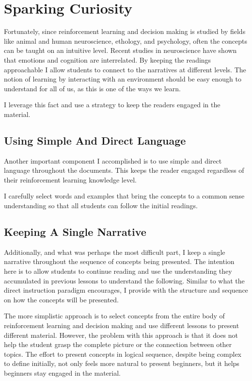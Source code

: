 \documentclass[11pt]{article} %
\begin{document}
\section{Sparking Curiosity}

Fortunately, since reinforcement learning and decision making is studied
by fields like animal and human neuroscience, ethology, and psychology\cite{suttons98},
often the concepts can be taught on an intuitive level.
Recent studies in neuroscience have shown that emotions and cognition are
interrelated\cite{intuition}. By keeping the readings approachable I allow
students to connect to the narratives at different levels. The notion of
learning by interacting with an environment should be easy enough
to understand for all of us, as this is one of the ways we learn.

I leverage this fact and use a strategy to keep the readers engaged in the
material.

\subsection{Using Simple And Direct Language}

Another important component I accomplished is to use simple and direct
language throughout the documents. This keeps the reader engaged regardless
of their reinforcement learning knowledge level.

I carefully select words and examples that bring the concepts to a
common sense understanding so that all students can follow the initial
readings.

\subsection{Keeping A Single Narrative}

Additionally, and what was perhaps the most difficult part, I keep a single
narrative throughout the sequence of concepts being presented. The intention
here is to allow students to continue reading and use the understanding they
accumulated in previous lessons to understand the following. Similar to what
the direct instruction paradigm\cite{directinstruction} encourages, I provide
with the structure and sequence on how the concepts will be presented.

The more simplistic approach is to select concepts from the entire body of
reinforcement learning and decision making and use different lessons to present
different material. However, the problem with this approach is that it does
not help the student grasp the complete picture or the connection between other topics.
The effort to present concepts in logical sequence, despite being complex to define
initially, not only feels more natural to present beginners, but it helps
beginners stay engaged in the material.
\end{document}
